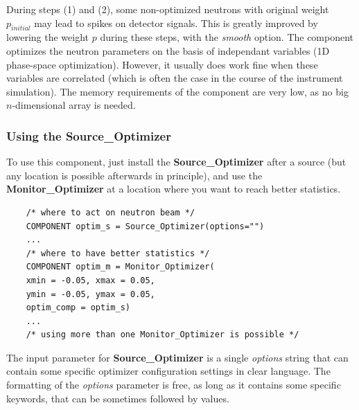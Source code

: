 During steps (1) and (2), some non-optimized neutrons with original
weight $p_{initial}$ may lead to spikes on detector signals. This is
greatly improved by lowering the weight $p$ during these steps, with the
\textit{smooth} option.
The component optimizes the neutron parameters on the basis of
independant variables (1D phase-space optimization). However, it usually does work fine when these
variables are correlated (which is often the case in the course of the
instrument simulation).
The memory requirements of the component are very low, as no big
$n$-dimensional array is needed.

\subsubsection{Using the Source\_Optimizer}

To use this component, just install the \textbf{Source\_Optimizer} after a
source (but any location is possible afterwards in principle), and use the \textbf{Monitor\_Optimizer} at a location where you want to reach better
statistics.

\begin{lstlisting}
    /* where to act on neutron beam */
    COMPONENT optim_s = Source_Optimizer(options="")
    ...
    /* where to have better statistics */
    COMPONENT optim_m = Monitor_Optimizer(
    xmin = -0.05, xmax = 0.05,
    ymin = -0.05, ymax = 0.05,
    optim_comp = optim_s)
    ...
    /* using more than one Monitor_Optimizer is possible */
\end{lstlisting}

The input parameter for \textbf{Source\_Optimizer} is a single \textit{
  options} string that can contain some specific optimizer configuration
settings in clear language. The formatting of the \textit{options}
parameter is free, as long as it contains some specific keywords, that
can be sometimes followed by values.

